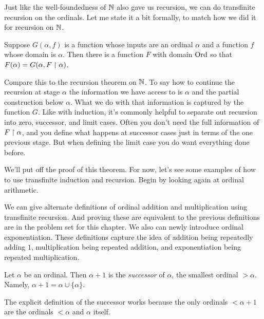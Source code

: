 \documentclass[10pt]{amsart}
\begin{document}
Just like the well-foundedness of $\mathbb{N}$ also gave us recursion, we can do transfinite recursion on the ordinals. Let me state it a bit formally, to match how we did it for recursion on $\mathbb{N}$.

\begin{theorem}
Suppose $G(\alpha,f)$ is a function whose inputs are an ordinal $\alpha$ and a function $f$ whose domain is $\alpha$. Then there is a function $F$ with domain $\mathrm{Ord}$ so that $F(\alpha) = G(\alpha, F \upharpoonright \alpha)$.
\end{theorem}

Compare this to the recursion theorem on $\mathbb{N}$. To say how to continue the recursion at stage $\alpha$ the information we have access to is $\alpha$ and the partial construction below $\alpha$. What we do with that information is captured by the function $G$. Like with induction, it's commonly helpful to separate out recursion into zero, successor, and limit cases. Often you don't need the full information of $F \upharpoonright \alpha$, and you define what happens at successor cases just in terms of the one previous stage. But when defining the limit case you do want everything done before. 

We'll put off the proof of this theorem. For now, let's see some examples of how to use transfinite induction and recursion. Begin by looking again at ordinal arithmetic.

We can give alternate definitions of ordinal addition and multiplication using transfinite recursion. And proving these are equivalent to the previous definitions are in the problem set for this chapter. We also can newly introduce ordinal exponentiation. These definitions capture the idea of addition being repeatedly adding $1$, multiplication being repeated addition, and exponentiation being repeated multiplication.

\begin{definition}
Let $\alpha$ be an ordinal. Then $\alpha + 1$ is the \emph{successor} of $\alpha$, the smallest ordinal $> \alpha$. Namely, $\alpha + 1 = \alpha \cup \{\alpha\}$.
\end{definition}

The explicit definition of the successor works because the only ordinals $<\alpha + 1$ are the ordinals $<\alpha$ and $\alpha$ itself.
\end{document}
